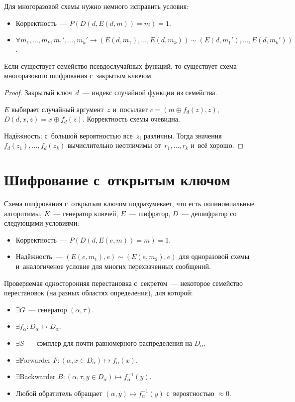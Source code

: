 \documentclass{article}
\begin{document}
Для многоразовой схемы нужно немного исправить условия:
\begin{itemize}
	\item Корректность~--- $P(D(d, E(d,m)) = m) = 1$.
	\item $\forall m_1, \ldots, m_k, m_1', \ldots, m_k' \rightarrow (E(d, m_1),
		\ldots, E(d, m_k)) \sim (E(d, m_1'), \ldots, E(d, m_k'))$.
\end{itemize}

\begin{theorem}
	Если существует семейство псевдослучайных функций, то существует схема
	многоразового шифрования с~закрытым ключом.
\end{theorem}
\begin{proof}
	Закрытый ключ~$d$~--- индекс случайной функции из семейства.

	$E$ выбирает случайный аргумент~$z$ и~посылает $c = (m \oplus f_d(z), z)$,
	$D(d, x, z) = x \oplus f_d(z)$. Корректность схемы очевидна.

	Надёжность: с~большой вероятностью все~$z_i$ различны. Тогда значения
	$f_d(z_1), \ldots, f_d(z_k)$ вычислительно неотличимы от~$r_1, \ldots, r_k$
	и~всё хорошо.
\end{proof}

\section{Шифрование с~открытым ключом}

Схема шифрования с~открытым ключом подразумевает, что есть полиномиальные
алгоритимы, $K$~--- генератор ключей, $E$~--- шифратор, $D$~--- дешифратор
со следующими условиями:
\begin{itemize}
	\item Корректность~--- $P(D(d, E(e,m)) = m) = 1$.
	\item Надёжность~--- $(E(e, m_1), e) \sim (E(e, m_2), e)$ для одноразовой
		схемы и~аналогиченое условие для многих перехваченных сообщений.
\end{itemize}

\begin{definition}
	Проверяемая односторонняя перестановка с~секретом~--- некоторое семейство
	перестановок (на разных областях определения), для которой:
	\begin{itemize}
		\item $\exists G$~--- генератор $(\alpha, \tau)$.
		\item $\exists f_\alpha: D_\alpha \leftrightarrow D_\alpha$.
		\item $\exists S$~--- сэмплер для почти равномерного распределения на
			$D_\alpha$.
		\item $\exists$Forwarder $F: (\alpha, x \in D_\alpha) \mapsto f_\alpha(x)$.
		\item $\exists$Backwarder $B: (\alpha, \tau, y \in D_\alpha) \mapsto
			f_\alpha^{-1}(y)$.
		\item Любой обратитель обращает $(\alpha, y) \mapsto
			f_\alpha^{-1}(y)$ с~вероятностью $\approx 0$.
	\end{itemize}
\end{definition}
\end{document}
